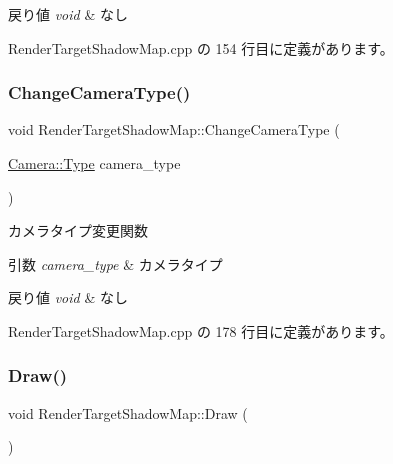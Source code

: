 \begin{DoxyRetVals}{戻り値}
{\em void} & なし \\
\hline
\end{DoxyRetVals}


 Render\+Target\+Shadow\+Map.\+cpp の 154 行目に定義があります。

\mbox{\label{class_render_target_shadow_map_a669ba6344e84fba605983c827fb1dc69}} 
\subsubsection{\texorpdfstring{Change\+Camera\+Type()}{ChangeCameraType()}}
{\footnotesize\ttfamily void Render\+Target\+Shadow\+Map\+::\+Change\+Camera\+Type (\begin{DoxyParamCaption}\item[{\mbox{\hyperlink{class_camera_a3b0a1f58deca679ac665f61c480d1dcb}{Camera\+::\+Type}}}]{camera\+\_\+type }\end{DoxyParamCaption})\hspace{0.3cm}{\ttfamily [private]}}



カメラタイプ変更関数 


\begin{DoxyParams}{引数}
{\em camera\+\_\+type} & カメラタイプ \\
\hline
\end{DoxyParams}

\begin{DoxyRetVals}{戻り値}
{\em void} & なし \\
\hline
\end{DoxyRetVals}


 Render\+Target\+Shadow\+Map.\+cpp の 178 行目に定義があります。

\mbox{\label{class_render_target_shadow_map_afc267e5e736c1bbeb2290663df2a4b01}} 
\subsubsection{\texorpdfstring{Draw()}{Draw()}}
{\footnotesize\ttfamily void Render\+Target\+Shadow\+Map\+::\+Draw (\begin{DoxyParamCaption}{ }\end{DoxyParamCaption})}



